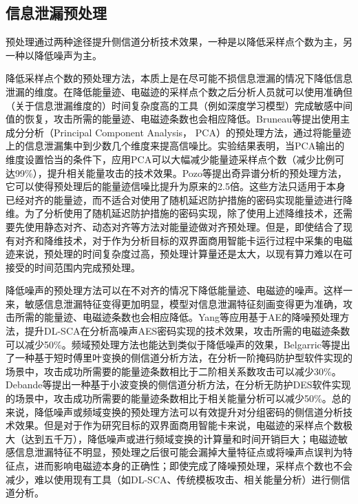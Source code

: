{	\subsection{信息泄漏预处理}
	预处理通过两种途径提升侧信道分析技术效果，一种是以降低采样点个数为主，另一种以降低噪声为主。
	
	降低采样点个数的预处理方法，本质上是在尽可能不损信息泄漏的情况下降低信息泄漏的维度。在降低能量迹、电磁迹的采样点个数之后分析人员就可以使用准确但（关于信息泄漏维度的）时间复杂度高的工具（例如深度学习模型）完成敏感中间值的恢复，攻击所需的能量迹、电磁迹条数也会相应降低。Bruneau等\citep{bruneau:hal-01218072}提出使用主成分分析（Principal Component Analysis， PCA）的预处理方法，通过将能量迹上的信息泄漏集中到少数几个维度来提高信噪比。实验结果表明，当PCA输出的维度设置恰当的条件下，应用PCA可以大幅减少能量迹采样点个数（减少比例可达99\%），提升相关能量攻击的技术效果。Pozo等\citep{Pozo15}提出奇异谱分析的预处理方法，它可以使得预处理后的能量迹信噪比提升为原来的2.5倍。这些方法只适用于本身已经对齐的能量迹，而不适合对使用了随机延迟防护措施的密码实现能量迹进行降维。为了分析使用了随机延迟防护措施的密码实现，除了使用上述降维技术，还需要先使用静态对齐\citep{Homma08}、动态对齐\citep{Woudenberg11}等方法对能量迹做对齐预处理。但是，即使结合了现有对齐和降维技术，对于作为分析目标的双界面商用智能卡运行过程中采集的电磁迹来说，预处理的时间复杂度过高，预处理计算量还是太大，以现有算力难以在可接受的时间范围内完成预处理。
	
	降低噪声的预处理方法可以在不对齐的情况下降低能量迹、电磁迹的噪声。这样一来，敏感信息泄漏特征变得更加明显，模型对信息泄漏特征刻画变得更为准确，攻击所需的能量迹、电磁迹条数也会相应降低。Yang等\citep{Yang19}应用基于AE的降噪预处理方法，提升DL-SCA在分析高噪声AES密码实现的技术效果，攻击所需的电磁迹条数可以减少50\%。频域预处理方法也能达到类似于降低噪声的效果，Belgarric等\citep{Belgarric16}提出了一种基于短时傅里叶变换的侧信道分析方法，在分析一阶掩码防护型软件实现的场景中，攻击成功所需要的能量迹条数相比于二阶相关系数攻击可以减少30\%。Debande等\citep{Debande12}提出一种基于小波变换的侧信道分析方法，在分析无防护DES软件实现的场景中，攻击成功所需要的能量迹条数相比于相关能量分析可以减少50\%。总的来说，降低噪声或频域变换的预处理方法可以有效提升对分组密码的侧信道分析技术效果。但是对于作为研究目标的双界面商用智能卡来说，电磁迹的采样点个数极大（达到五千万），降低噪声或进行频域变换的计算量和时间开销巨大；电磁迹敏感信息泄漏特征不明显，预处理之后很可能会漏掉大量特征点或将噪声点误判为特征点，进而影响电磁迹本身的正确性；即使完成了降噪预处理，采样点个数也不会减少，难以使用现有工具（如DL-SCA、传统模板攻击、相关能量分析）进行侧信道分析。
	
}
